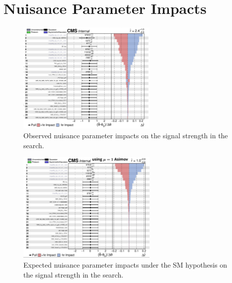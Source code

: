 \section{Nuisance Parameter Impacts}\label{sec:appendix_impacts}

\begin{figure}[htb]
  \centering
   \includegraphics[width=0.6\textwidth]{fig/impacts/observed_impacts.png}
	\caption{Observed nuisance parameter impacts on the signal strength in the \hzg{} search.}
\end{figure}

\begin{figure}[htb]
  \centering
   \includegraphics[width=0.6\textwidth]{fig/impacts/expected_impacts.png}
	\caption{Expected nuisance parameter impacts under the SM hypothesis on the signal strength in the \hzg{} search.}
\end{figure}

